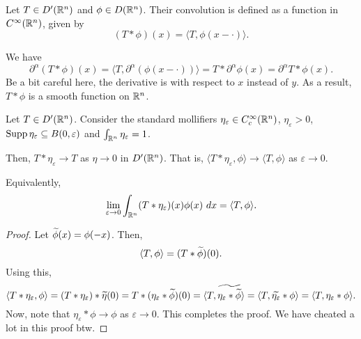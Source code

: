 \begin{definition}
    Let $T\in D'(\mathbb{R}^n)$ and $\phi\in D(\mathbb{R}^n)$. Their convolution is defined as a function in $C^\infty(\mathbb{R}^n)$, given by 
    \begin{equation*}
        (T\ast\phi)(x) = \langle T, \phi(x - \cdot)\rangle.
    \end{equation*}
\end{definition}

We have 
\begin{equation*}
    \partial^\alpha (T\ast\phi)(x) = \langle T, \partial^\alpha(\phi(x - \cdot))\rangle = T\ast\partial^\alpha\phi(x) = \partial^\alpha T\ast\phi(x).
\end{equation*}
Be a bit careful here, the derivative is with respect to $x$ instead of $y$. As a result, $T\ast\phi$ is a smooth function on $\mathbb{R}^n$.

\begin{lemma}
    Let $T\in D'(\mathbb{R}^n)$. Consider the standard mollifiers $\eta_\varepsilon\in C^\infty_c(\mathbb{R}^n)$, $\eta_\varepsilon > 0$, $\operatorname{Supp}\eta_\varepsilon\subseteq B(0,\varepsilon)$ and $\int_{\mathbb{R}^n}\eta_\varepsilon = 1$.

    Then, $T\ast\eta_\varepsilon\to T$ as $\eta\to 0$ in $D'(\mathbb{R}^n)$. That is, $\langle T\ast\eta_\varepsilon,\phi\rangle\to\langle T,\phi\rangle$ as $\varepsilon\to 0$.

    Equivalently, 
    \begin{equation*}
        \lim_{\varepsilon\to 0}\int_{\mathbb{R}^n} (T\ast\eta_\varepsilon)(x)\phi(x)~dx = \langle T, \phi\rangle.
    \end{equation*}
\end{lemma}
\begin{proof}
    Let $\widetilde{\phi}(x) = \phi(-x)$. Then, 
    \begin{equation*}
        \langle T,\phi\rangle =(T\ast\widetilde{\phi})(0).
    \end{equation*}
    Using this,
    \begin{equation*}
        \langle T\ast\eta_\varepsilon, \phi\rangle = (T\ast\eta_\varepsilon)\ast\widetilde{\eta}(0) = T\ast(\eta_\varepsilon\ast\widetilde{\phi})(0) = \langle T, \widetilde{\eta_\varepsilon\ast\widetilde{\phi}}\rangle = \langle T, \widetilde{\eta_\varepsilon}\ast\phi\rangle = \langle T, \eta_\varepsilon\ast\phi\rangle.
    \end{equation*}
    Now, note that $\eta_\varepsilon\ast\phi\to\phi$ as $\varepsilon\to 0$. This completes the proof. We have cheated a lot in this proof btw.
\end{proof}

